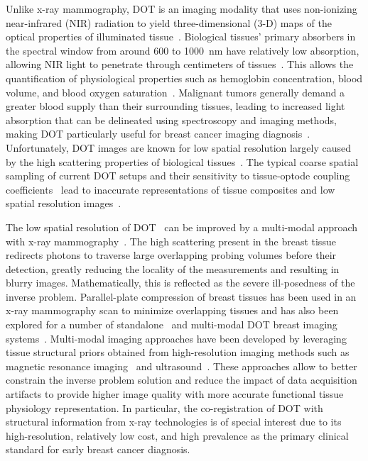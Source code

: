 Unlike x-ray mammography, DOT is an imaging modality that uses non-ionizing near-infrared (NIR) radiation to yield three-dimensional (3-D) maps of the optical properties of illuminated tissue~\cite{Boas2001, Dehghani2009, Yamada2014, Hoshi2016}. Biological tissues' primary absorbers in the spectral window from around 600 to 1000~nm have relatively low absorption, allowing NIR light to penetrate through centimeters of tissues~\cite{Gibson2005}. This allows the quantification of physiological properties such as hemoglobin concentration, blood volume, and blood oxygen saturation~\cite{Leff2008, Boas2001}. Malignant tumors generally demand a greater blood supply than their surrounding tissues, leading to increased light absorption that can be delineated using spectroscopy and imaging methods, making DOT particularly useful for breast cancer imaging diagnosis~\cite{Wang2022, Vavadi2014, Flexman2013, Choe2009, Taroni2005}. Unfortunately, DOT images are known for low spatial resolution largely caused by the high scattering properties of biological tissues~\cite{Boas2001}. The typical coarse spatial sampling of current DOT setups and their sensitivity to tissue-optode coupling coefficients~\cite{Schweiger2007} lead to inaccurate representations of tissue composites and low spatial resolution images~\cite{Durduran2010}.

The low spatial resolution of DOT~\cite{Li2010} can be improved by a multi-modal approach with x-ray mammography~\cite{Zimmermann2017, Deng2015, Deng2015a, Fang2009a}. The high scattering present in the breast tissue redirects photons to traverse large overlapping probing volumes before their detection, greatly reducing the locality of the measurements and resulting in blurry images. Mathematically, this is reflected as the severe ill-posedness of the inverse problem. Parallel-plate compression of breast tissues has been used in an x-ray mammography scan to minimize overlapping tissues and has also been explored for a number of standalone~\cite{Choe2009, Culver2003} and multi-modal DOT breast imaging systems~\cite{ZhuReview2020, Fang2009a, Krishnaswamy2012}. Multi-modal imaging approaches have been developed by leveraging tissue structural priors obtained from high-resolution imaging methods such as magnetic resonance imaging~\cite{Ghussein2013,Ntziachristos2002} and ultrasound~\cite{Zhu2010}. These approaches allow to better constrain the inverse problem solution and reduce the impact of data acquisition artifacts to provide higher image quality with more accurate functional tissue physiology representation. In particular, the co-registration of DOT with structural information from x-ray technologies is of special interest due to its high-resolution, relatively low cost, and high prevalence as the primary clinical standard for early breast cancer diagnosis.

